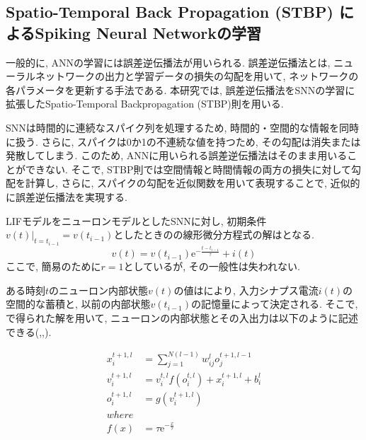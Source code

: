 \subsection{Spatio-Temporal Back Propagation (STBP) によるSpiking Neural Networkの学習}

一般的に, ANNの学習には誤差逆伝播法が用いられる.
誤差逆伝播法とは, ニューラルネットワークの出力と学習データの損失の勾配を用いて, ネットワークの各パラメータを更新する手法である.
本研究では, 誤差逆伝播法をSNNの学習に拡張したSpatio-Temporal Backpropagation (STBP)則\cite{stbp}を用いる.

SNNは時間的に連続なスパイク列を処理するため, 時間的・空間的な情報を同時に扱う.
さらに, スパイクは0か1の不連続な値を持つため, その勾配は消失または発散してしまう.
このため, ANNに用いられる誤差逆伝播法はそのまま用いることができない.
そこで, STBP則では空間情報と時間情報の両方の損失に対して勾配を計算し, さらに, スパイクの勾配を近似関数を用いて表現することで, 近似的に誤差逆伝播法を実現する.

LIFモデルをニューロンモデルとしたSNNに対し, 初期条件$v(t)|_{t=t_{i-1}}=v(t_{i-1})$としたときのの線形微分方程式の解はとなる.
\begin{equation}
    v(t) = v \left(t_{i-1}\right) \mathrm{e}^{-\frac{t-t_{i-1}}{\tau}} + i(t)
    \label{eq:snn:lif:diff}
\end{equation}
ここで, 簡易のために$r=1$としているが, その一般性は失われない.

ある時刻$t$のニューロン内部状態$v(t)$の値はにより, 入力シナプス電流$i(t)$の空間的な蓄積と, 以前の内部状態$v(t_{i-1})$の記憶量によって決定される.
そこで, で得られた解を用いて, ニューロンの内部状態とその入出力は以下のように記述できる(,,).

\begin{align}
    x_i^{t+1,l} &= \sum_{j=1}^{N(l-1)} w_{ij}^{l} o_j^{t+1,l-1} \label{eq:snn:lif:state} \\
    v_i^{t+1,l} &= v_i^{t,l} f\left(o_i^{t,l}\right) + x_i^{t+1,l} + b_i^l \label{eq:snn:lif:state2} \\
    o_i^{t+1,l} &= g\left(v_i^{t+1,l}\right) \label{eq:snn:lif:state3}\\
    where\\
    f\left(x\right) &= \tau \mathrm{e}^{-\frac{x}{\tau}} \label{eq:snn:lif:state4}
\end{align}


